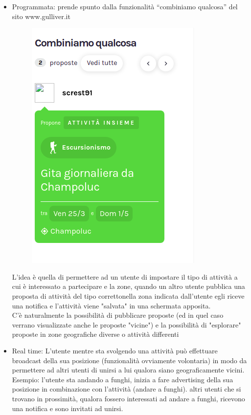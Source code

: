 \documentclass[a4paper]{article}
\begin{document}
\begin{itemize}
	\item Programmata: prende spunto dalla funzionalità “combiniamo qualcosa” del sito www.gulliver.it 
	\begin{figure}[H]
		\centering
		\includegraphics[scale = 0.5]{gulliver.png}
	\end{figure}
	L'idea è quella di permettere ad un utente di impostare il tipo di attività a cui è interessato a partecipare e la zone, quando un altro utente pubblica una proposta di attività del tipo correttonella zona indicata dall'utente egli riceve una notifica e l'attività viene "salvata" in una schermata apposita.\\
	C'è naturalmente la possibilità di pubblicare proposte (ed in quel caso verrano visualizzate anche le proposte "vicine") e la possibilità di "esplorare" proposte in zone geografiche diverse o attività differenti 
	\item Real time: L'utente mentre sta svolgendo una attività può effettuare broadcast della sua posizione (funzionalità ovviamente volontaria) in modo da permettere ad altri utenti di unirsi a lui qualora siano geograficamente vicini.\\
		Esempio: l'utente sta andando a funghi, inizia a fare advertising della sua posizione in combinazione con l'attività (andare a funghi). altri utenti che si trovano in prossimità, qualora fossero interessati ad andare a funghi, ricevono una notifica e sono invitati ad unirsi.

\end{itemize}
\end{document}
